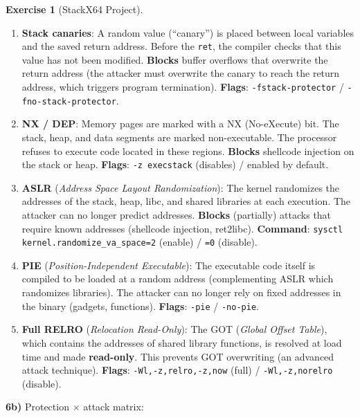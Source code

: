 \documentclass[a4paper,11pt]{article}
\theoremstyle{plain}
\theoremstyle{definition}
\newtheorem{exercice}{Exercise}
\begin{document}
\begin{exercice}[StackX64 Project]
\begin{correction}
\begin{enumerate}
\item \textbf{Stack canaries}: A random value (``canary'') is placed between local variables and the saved return address. Before the \texttt{ret}, the compiler checks that this value has not been modified. \textbf{Blocks} buffer overflows that overwrite the return address (the attacker must overwrite the canary to reach the return address, which triggers program termination). \textbf{Flags}: \texttt{-fstack-protector} / \texttt{-fno-stack-protector}.

\item \textbf{NX / DEP}: Memory pages are marked with a NX (No-eXecute) bit. The stack, heap, and data segments are marked non-executable. The processor refuses to execute code located in these regions. \textbf{Blocks} shellcode injection on the stack or heap. \textbf{Flags}: \texttt{-z execstack} (disables) / enabled by default.

\item \textbf{ASLR} (\textit{Address Space Layout Randomization}): The kernel randomizes the addresses of the stack, heap, libc, and shared libraries at each execution. The attacker can no longer predict addresses. \textbf{Blocks} (partially) attacks that require known addresses (shellcode injection, ret2libc). \textbf{Command}: \texttt{sysctl kernel.randomize\_va\_space=2} (enable) / \texttt{=0} (disable).

\item \textbf{PIE} (\textit{Position-Independent Executable}): The executable code itself is compiled to be loaded at a random address (complementing ASLR which randomizes libraries). The attacker can no longer rely on fixed addresses in the binary (gadgets, functions). \textbf{Flags}: \texttt{-pie} / \texttt{-no-pie}.

\item \textbf{Full RELRO} (\textit{Relocation Read-Only}): The GOT (\textit{Global Offset Table}), which contains the addresses of shared library functions, is resolved at load time and made \textbf{read-only}. This prevents GOT overwriting (an advanced attack technique). \textbf{Flags}: \texttt{-Wl,-z,relro,-z,now} (full) / \texttt{-Wl,-z,norelro} (disable).
\end{enumerate}

\textbf{6b)} Protection $\times$ attack matrix:


\end{correction}
\end{exercice}
\end{document}
